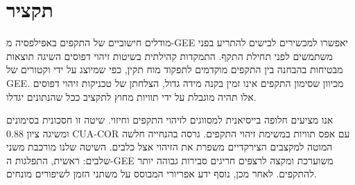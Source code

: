 \chapter*{תקציר}

מודלים חישוביים של התקפים באפילפסיה מ-GEE יאפשרו למכשירים לבישים להתריע בפני משתמשים לפני תחילת התקף. התמקדות קהילתית בשיטות זיהוי דפוסים השיגה תוצאות מבטיחות בהבחנה בין התקפים מוקדמים לתפקוד מוח תקין, כפי שמיוצג על ידי וקטורים של GEE. מכיוון שסימון התקפים אינו זמין בקנה מידה גדול, הצלחתן של טכניקות זיהוי דפוסים אלו תהיה מוגבלת על ידי תוויות מחוץ לתקציב ככל שהנתונים יגדלו.

אנו מציעים חלופה בייסיאנית למסווגים לזיהוי התקפים וחיזוי. שיטה זו חסכונית בסימונים ומשיגה ציון 0.88 CUA-COR עם אפס תוויות במשימת זיהוי התקפים. גרסה בהנחייה חלשה המוטה למקצבים הצירקדיים משפרת את הזיהוי אצל כלבים. השיטה שלנו מורכבת משני שלבים: ראשית, התפלגות ה-GEE משוערכת ומקצה לרצפים חריגים סבירות גבוהה יותר להתקפים. לאחר מכן, נוסף ידע אפריורי המבוסס על משתני הזמן לשיפורים מונחים.
